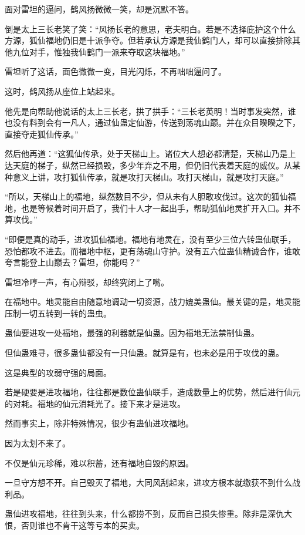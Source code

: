 
\begin{this_body}

面对雷坦的逼问，鹤风扬微微一笑，却是沉默不答。

倒是太上三长老笑了笑：“风扬长老的意思，老夫明白。若是不选择庇护这个什么方源，狐仙福地仍旧是十派争夺。但若承认方源是我仙鹤门人，却可以直接排除其他九位对手，惟独我仙鹤门一派来夺取这块福地。”

雷坦听了这话，面色微微一变，目光闪烁，不再咄咄逼问了。

这时，鹤风扬从座位上站起来。

他先是向帮助他说话的太上三长老，拱了拱手：“三长老英明！当时事发突然，谁也没有料到会有一凡人，通过仙蛊定仙游，传送到荡魂山巅。并在众目睽睽之下，直接夺走狐仙传承。”

然后他再道：“这狐仙传承，处于天梯山上。诸位大人想必都清楚，天梯山乃是上达天庭的梯子，纵然已经损毁，多少年弃之不用，但仍旧代表着天庭的威仪。从某种意义上讲，攻打狐仙传承，就是攻打天梯山。攻打天梯山，就是攻打天庭。”

“所以，天梯山上的福地，纵然数目不少，但从未有人胆敢攻伐过。这次的狐仙福地，也是等候着时间开启了，我们十人才一起出手，帮助狐仙地灵扩开入口。并不算攻伐。”

“即便是真的动手，进攻狐仙福地。福地有地灵在，没有至少三位六转蛊仙联手，恐怕都攻不进去。而福地中枢，更有荡魂山守护。没有五六位蛊仙精诚合作，谁敢夸言能登上山巅去？雷坦，你能吗？”

雷坦冷哼一声，有心辩驳，却终究闭上了嘴。

在福地中。地灵能自由随意地调动一切资源，战力媲美蛊仙。最关键的是，地灵能压制一切五转到一转的蛊虫。

蛊仙要进攻一处福地，最强的利器就是仙蛊。因为福地无法禁制仙蛊。

但仙蛊难寻，很多蛊仙都没有一只仙蛊。就算是有，也未必是用于攻伐的蛊。

这是典型的攻弱守强的局面。

若是硬要是进攻福地，往往都是数位蛊仙联手，造成数量上的优势，然后进行仙元的对耗。福地的仙元消耗光了。接下来才是进攻。

然而事实上，除非特殊情况，很少有蛊仙进攻福地。

因为太划不来了。

不仅是仙元珍稀，难以积蓄，还有福地自毁的原因。

一旦守方想不开。自己毁灭了福地，大同风刮起来，进攻方根本就缴获不到什么战利品。

蛊仙进攻福地，往往到头来，什么都捞不到，反而自己损失惨重。除非是深仇大恨，否则谁也不肯干这等亏本的买卖。


\end{this_body}
